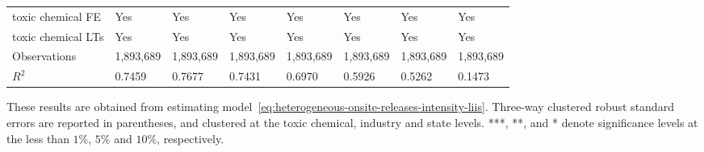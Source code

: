 \begin{table}[H]
{\begin{tabular}{@{}llllllll@{}}
            toxic chemical FE                     & Yes       & Yes           & Yes       & Yes          & Yes             & Yes           & Yes                 \\
            toxic chemical LTs                    & Yes       & Yes           & Yes       & Yes          & Yes             & Yes           & Yes                 \\ \midrule \midrule
            Observations                          & 1,893,689 & 1,893,689     & 1,893,689 & 1,893,689    & 1,893,689       & 1,893,689     & 1,893,689           \\
            $R^2$                                 & 0.7459    & 0.7677        & 0.7431    & 0.6970       & 0.5926          & 0.5262        & 0.1473              \\ \bottomrule \bottomrule
        \end{tabular}%
    }
    \begin{minipage}{18cm}
        \vspace{0.05in}
        These results are obtained from estimating model~\ref{eq:heterogeneous-onsite-releases-intensity-liis}. Three-way clustered robust standard errors are reported in parentheses, and clustered at the toxic chemical, industry and state levels. ***, **, and * denote significance levels at the less than $1\%$, $5\%$ and $10\%$, respectively.
    \end{minipage}
\end{table}
